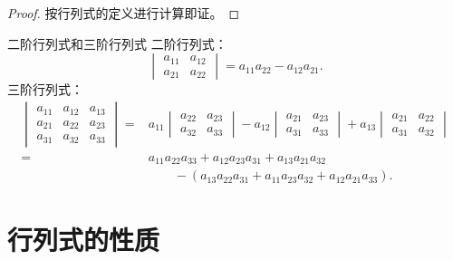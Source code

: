\begin{proof}
	按行列式的定义进行计算即证。
\end{proof}

\begin{example}
	{二阶行列式和三阶行列式}{}
	二阶行列式：
	\begin{equation}
			\begin{vmatrix}
				a_{11}&a_{12}\\a_{21}&a_{22}
			\end{vmatrix}=a_{11}a_{22}-a_{12}a_{21}.
	\end{equation}
	三阶行列式：
	\begin{equation}
		\begin{aligned}
			\begin{vmatrix}
				a_{11}&a_{12}&a_{13}\\
				a_{21}&a_{22}&a_{23}\\
				a_{31}&a_{32}&a_{33}
			\end{vmatrix}={}&a_{11}
			\begin{vmatrix}
				a_{22}&a_{23}\\
				a_{32}&a_{33}
			\end{vmatrix}-a_{12}
			\begin{vmatrix}
				a_{21}&a_{23}\\
				a_{31}&a_{33}
			\end{vmatrix}+a_{13}
			\begin{vmatrix}
				a_{21}&a_{22}\\
				a_{31}&a_{32}
			\end{vmatrix}\\
			={}&a_{11}a_{22}a_{33}+a_{12}a_{23}a_{31}+a_{13}a_{21}a_{32}\\
			&\qquad-(a_{13}a_{22}a_{31}+a_{11}a_{23}a_{32}+a_{12}a_{21}a_{33}).
		\end{aligned}
	\end{equation}
\end{example}

\section{行列式的性质}

